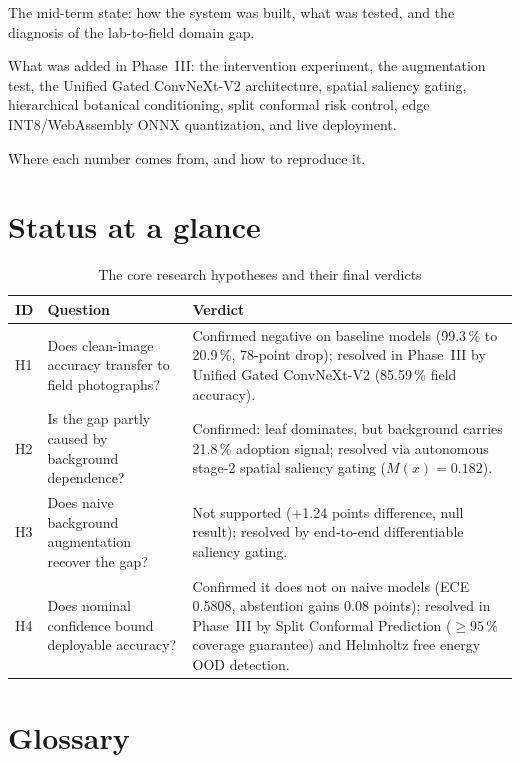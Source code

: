 \begin{description}[leftmargin=1.2em,labelindent=0em,itemsep=3pt]
\item[Part I] The mid-term state: how the system was built, what was tested, and the diagnosis of the lab-to-field domain gap.
\item[Part II] What was added in Phase~III: the intervention experiment, the augmentation test, the Unified Gated ConvNeXt-V2 architecture, spatial saliency gating, hierarchical botanical conditioning, split conformal risk control, edge INT8/WebAssembly ONNX quantization, and live deployment.
\item[Appendix] Where each number comes from, and how to reproduce it.
\end{description}

\section*{Status at a glance}

\begin{table}[H]
\centering
\caption{The core research hypotheses and their final verdicts}
\label{tab:verdicts}
\tabfont
\begin{tabularx}{\textwidth}{@{}lYY@{}}
\toprule
\textbf{ID} & \textbf{Question} & \textbf{Verdict} \\
\midrule
H1 & Does clean-image accuracy transfer to field photographs? & Confirmed negative on baseline models (99.3\,\% to 20.9\,\%, 78-point drop); resolved in Phase~III by Unified Gated ConvNeXt-V2 (85.59\,\% field accuracy). \\
H2 & Is the gap partly caused by background dependence? & Confirmed: leaf dominates, but background carries 21.8\,\% adoption signal; resolved via autonomous stage-2 spatial saliency gating ($M(x) = 0.182$). \\
H3 & Does naive background augmentation recover the gap? & Not supported (+1.24 points difference, null result); resolved by end-to-end differentiable saliency gating. \\
H4 & Does nominal confidence bound deployable accuracy? & Confirmed it does not on naive models (ECE 0.5808, abstention gains 0.08 points); resolved in Phase~III by Split Conformal Prediction ($\ge 95\,\%$ coverage guarantee) and Helmholtz free energy OOD detection. \\
\bottomrule
\end{tabularx}
\end{table}

\section*{Glossary}

